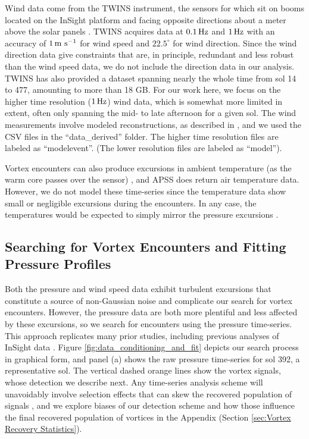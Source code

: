 \documentclass{aastex63}
\begin{document}
Wind data come from the TWINS instrument, the sensors for which sit on booms located on the InSight platform and facing opposite directions about a meter above the solar panels \citep{2020NatGe..13..190B}. TWINS acquires data at $0.1\, {\rm Hz}$ and $1\, {\rm Hz}$ with an accuracy of $1\, {\rm m\ s^{-1}}$ for wind speed and $22.5^\circ$ for wind direction. Since the wind direction data give constraints that are, in principle, redundant and less robust than the wind speed data, we do not include the direction data in our analysis. TWINS has also provided a dataset spanning nearly the whole time from sol 14 to 477, amounting to more than 18 GB. For our work here, we focus on the higher time resolution ($1\, {\rm Hz}$) wind data, which is somewhat more limited in extent, often only spanning the mid- to late afternoon for a given sol. The wind measurements involve modeled reconstructions, as described in  \citep{Banfield2018}, and we used the CSV files in the ``data\_derived'' folder. The higher time resolution files are labeled as ``modelevent''. (The lower resolution files are labeled as ``model'').

Vortex encounters can also produce excursions in ambient temperature (as the warm core passes over the sensor) \citep{2016SSRv..203...39M}, and APSS does return air temperature data. However, we do not model these time-series since the temperature data show small or negligible excursions during the encounters. In any case, the temperatures would be expected to simply mirror the pressure excursions \citep{2016Icar..271..326L}.

\subsection{Searching for Vortex Encounters and Fitting Pressure Profiles}
Both the pressure and wind speed data exhibit turbulent excursions that constitute a source of non-Gaussian noise and complicate our search for vortex encounters. However, the pressure data are both more plentiful and less affected by these excursions, so we search for encounters using the pressure time-series. This approach replicates many prior studies, including previous analyses of InSight data \citep{2020arXiv200501134S, 2021Icar..35514119L}. Figure \ref{fig:data_conditioning_and_fit} depicts our search process in graphical form, and panel (a) shows the raw pressure time-series for sol 392, a representative sol. The vertical dashed orange lines show the vortex signals, whose detection we describe next. Any time-series analysis scheme will unavoidably involve selection effects that can skew the recovered population of signals \citep{2018Icar..299..166J}, and we explore biases of our detection scheme and how those influence the final recovered population of vortices in the Appendix (Section \ref{sec:Vortex Recovery Statistics}). 
\end{document}
